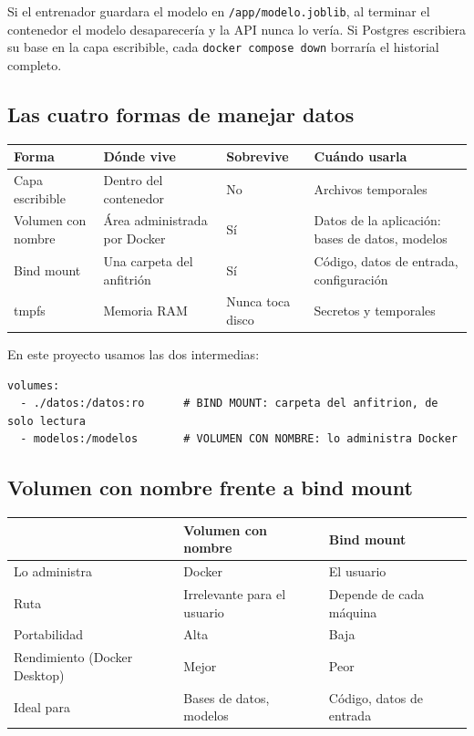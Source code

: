 \documentclass[12pt,a4paper]{article}
\begin{document}
Si el entrenador guardara el modelo en \texttt{/app/modelo.joblib}, al terminar el contenedor el
modelo desaparecer\'ia y la API nunca lo ver\'ia. Si Postgres escribiera su base en la capa
escribible, cada \texttt{docker compose down} borrar\'ia el historial completo.

\subsection{Las cuatro formas de manejar datos}

\begin{center}
\begin{tabular}{|l|p{3.6cm}|l|p{4cm}|}
\hline
\textbf{Forma} & \textbf{D\'onde vive} & \textbf{Sobrevive} & \textbf{Cu\'ando usarla} \\
\hline
Capa escribible & Dentro del contenedor & No & Archivos temporales \\
\hline
Volumen con nombre & \'Area administrada por Docker & S\'i & Datos de la aplicaci\'on: bases de
datos, modelos \\
\hline
Bind mount & Una carpeta del anfitri\'on & S\'i & C\'odigo, datos de entrada, configuraci\'on \\
\hline
tmpfs & Memoria RAM & Nunca toca disco & Secretos y temporales \\
\hline
\end{tabular}
\end{center}

En este proyecto usamos las dos intermedias:

\begin{verbatim}
volumes:
  - ./datos:/datos:ro      # BIND MOUNT: carpeta del anfitrion, de solo lectura
  - modelos:/modelos       # VOLUMEN CON NOMBRE: lo administra Docker
\end{verbatim}

\subsection{Volumen con nombre frente a bind mount}

\begin{center}
\begin{tabular}{|l|l|l|}
\hline
& \textbf{Volumen con nombre} & \textbf{Bind mount} \\
\hline
Lo administra & Docker & El usuario \\
Ruta & Irrelevante para el usuario & Depende de cada m\'aquina \\
Portabilidad & Alta & Baja \\
Rendimiento (Docker Desktop) & Mejor & Peor \\
Ideal para & Bases de datos, modelos & C\'odigo, datos de entrada \\
\hline
\end{tabular}
\end{center}
\end{document}
